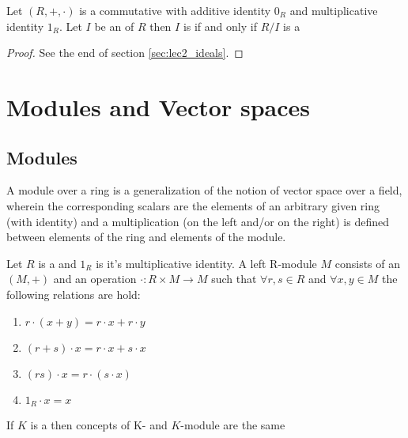 \begin{appendices}
\begin{theorem}
  Let $\left(R, +, \cdot\right)$ is a commutative 
  with additive identity $0_R$ and multiplicative identity $1_R$. Let
  $I$ be an  of $R$ then $I$ is
   if and only if 
  $R/I$ is a 
  \begin{proof}
    See the end of section \ref{sec:lec2_ideals}.
  \end{proof}
  \label{thm:maxideal}
\end{theorem}

\section{Modules and Vector spaces}

\subsection{Modules}

A module over a ring is a generalization of the notion of vector space
over a field, wherein the corresponding scalars are the elements of an
arbitrary given ring (with identity) and a multiplication (on the left
and/or on the right) is defined between elements of the ring and
elements of the module.

\begin{definition}[Module]
  Let $R$ is a  and $1_R$ is it's multiplicative
  identity. A left R-module $M$ consists of an 
  $\left(M, +\right)$ and an operation $\cdot: R \times M \to M$ such
  that $\forall r,s \in R$ and $\forall x,y \in M$ the following
  relations are hold:
  \begin{enumerate}
  \item $r \cdot \left(x+y\right) = r \cdot x + r \cdot y$
  \item $\left(r + s \right) \cdot x = r \cdot x + s \cdot x$
  \item $\left(rs\right) \cdot x = r \cdot \left(s \cdot x\right)$
  \item $1_R \cdot x = x$
  \end{enumerate}
  \label{def:module}
\end{definition}

\begin{example}[Module]
  If $K$ is a  then concepts of
  K- and $K$-module are the same
\end{example}


\end{appendices}

